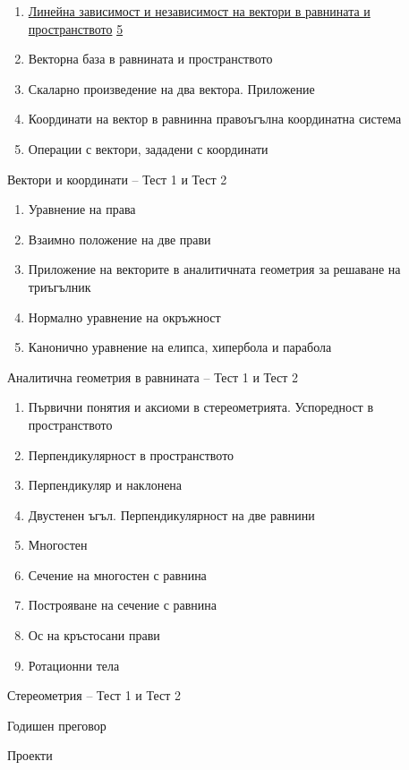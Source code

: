 \documentclass[12pt,a4paper]{article}
\newcommand{\seclabel}{lesson11}
\begin{document}
{\color{tocgreen}
\par
\vspace{0.2cm}
\par
\begin{enumerate}[label=1.\arabic*.,leftmargin=1.5cm]
\item \hyperref[\seclabel]{Линейна зависимост и независимост на вектори в равнината и пространството} \dotfill \hyperref[\seclabel]{5}
\item Векторна база в равнината и пространството 
\item Скаларно произведение на два вектора. Приложение 
\item Координати на вектор в равнинна правоъгълна координатна система 
\item Операции с вектори, зададени с координати 
\end{enumerate}
\noindent Вектори и координати -- Тест 1 и Тест 2 

\vspace{0.3cm}
\par
\begin{enumerate}[label=2.\arabic*.,leftmargin=1.5cm]
\item Уравнение на права 
\item Взаимно положение на две прави 
\item Приложение на векторите в аналитичната геометрия за решаване на триъгълник 
\item Нормално уравнение на окръжност 
\item Канонично уравнение на елипса, хипербола и парабола 
\end{enumerate}
\noindent Аналитична геометрия в равнината -- Тест 1 и Тест 2 

\vspace{0.3cm}
\par
\begin{enumerate}[label=3.\arabic*.,leftmargin=1.5cm]
\item Първични понятия и аксиоми в стереометрията. Успоредност в пространството 
\item Перпендикулярност в пространството 
\item Перпендикуляр и наклонена 
\item Двустенен ъгъл. Перпендикулярност на две равнини 
\item Многостен 
\item Сечение на многостен с равнина 
\item Построяване на сечение с равнина 
\item Ос на кръстосани прави 
\item Ротационни тела 
\end{enumerate}
\noindent Стереометрия -- Тест 1 и Тест 2 \par
\noindent Годишен преговор \par
\noindent Проекти 

}
\end{document}
